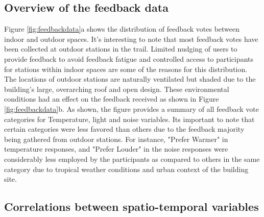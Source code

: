 


\subsection{Overview of the feedback data}

Figure \ref{fig:feedbackdata}a shows the distribution of feedback votes between indoor and outdoor spaces. It's interesting to note that most feedback votes have been collected at outdoor stations in the trail. Limited nudging of users to provide feedback to avoid feedback fatigue \cite{EffectsFeedbackFatigue} and controlled access to participants for stations within indoor spaces are some of the reasons for this distribution.\\


The locations of outdoor stations are naturally ventilated but shaded due to the building's large, overarching roof and open design. These environmental conditions had an effect on the feedback received as shown in Figure \ref{fig:feedbackdata}b. As shown, the figure provides a summary of all feedback vote categories for Temperature, light and noise variables. Its important to note that certain categories were less favored than others due to the feedback majority being gathered from outdoor stations. For instance, "Prefer Warmer" in temperature responses, and "Prefer Louder" in the noise responses were considerably less employed by the participants as compared to others in the same category due to tropical weather conditions and urban context of the building site.    




\subsection{Correlations between spatio-temporal variables}


